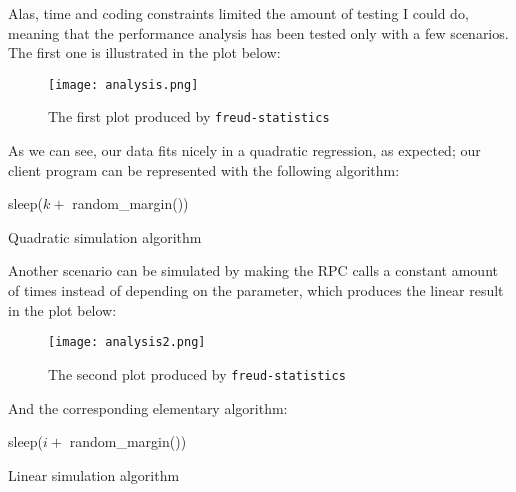     Alas, time and coding constraints limited the amount of testing I could do,
    meaning that the performance analysis has been tested only with a few scenarios. The first one
    is illustrated in the plot below:\\

    \begin{figure}[H]
        \centering
        \texttt{[image: analysis.png]}
        \caption{The first plot produced by \texttt{freud-statistics}}
        \label{fig:analysis1}
    \end{figure}

    As we can see, our data fits nicely in a quadratic regression, as expected;
    our client program can be represented with the following algorithm:\\

    \begin{algorithm}[H]
         {
             {
                 {
                    sleep($k + $ random\_margin())\;
                }
            }
        }
        \caption{Quadratic simulation algorithm}
    \end{algorithm}

    \vspace{5mm}

    Another scenario can be simulated by making the RPC calls a constant amount of times instead
    of depending on the parameter, which produces the linear result in the plot below:\\

    \begin{figure}[H]
        \centering
        \texttt{[image: analysis2.png]}
        \caption{The second plot produced by \texttt{freud-statistics}}
        \label{fig:analysis2}
    \end{figure}

    And the corresponding elementary algorithm:\\

    \begin{algorithm}[H]
        \SetAlgoLined
         {
             {
                sleep($i + $ random\_margin())\;
            }
        }
        \caption{Linear simulation algorithm}
    \end{algorithm}

    \vspace{5mm}


